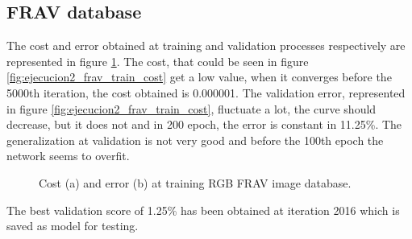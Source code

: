 \subsection{FRAV database}
The cost and error obtained at training and validation processes respectively are represented in figure \ref{fig:ejecucion2_frav_train}. The cost, that could be seen in figure \ref{fig:ejecucion2_frav_train_cost} get a low value, when it converges before the 5000th iteration, the cost obtained is 0.000001. The validation error, represented in figure \ref{fig:ejecucion2_frav_train_cost}, fluctuate a lot, the curve should decrease, but it does not and in 200 epoch, the error is constant in 11.25\%. The generalization at validation is not very good and before the 100th epoch the network seems to overfit.\\
\begin{figure}[htb]
\centering
\caption{Cost (a) and error (b) at training RGB FRAV image database.}
\label{fig:ejecucion2_frav_train}
\end{figure}

The best validation score of 1.25\% has been obtained at iteration 2016 which is saved as model for testing.

